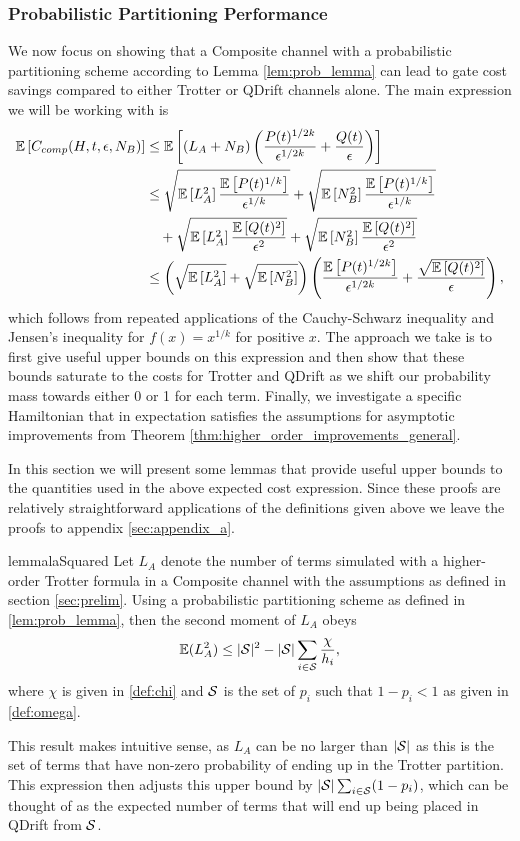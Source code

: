\subsubsection{Probabilistic Partitioning Performance} \label{sec:prob_limits}
We now focus on showing that a Composite channel with a probabilistic partitioning scheme according to Lemma \ref{lem:prob_lemma} can lead to gate cost savings compared to either Trotter or QDrift channels alone. The main expression we will be working with is
\begin{align}
    \mathbb{E}\left[ C_{comp}(H, t, \epsilon, N_B) \right] &\leq \mathbb{E}\left[ (L_A + N_B)\left( \frac{P(t)^{1/2k}}{\epsilon^{1/2k}} + \frac{Q(t)}{\epsilon} \right) \right] \\
    &\leq \sqrt{\mathbb{E}\left[ L_A^2 \right] \frac{\mathbb{E}\left[ P(t)^{1/k} \right]}{\epsilon^{1/k}}} + \sqrt{\mathbb{E}\left[ N_B^2 \right] \frac{\mathbb{E}\left[ P(t)^{1/k} \right] }{\epsilon^{1/k}} } \nonumber \\
    &\quad + \sqrt{\mathbb{E}\left[ L_A^2 \right] \frac{\mathbb{E}\left[ Q(t)^2 \right]}{\epsilon^2}} + \sqrt{\mathbb{E}\left[ N_B^2 \right] \frac{\mathbb{E}\left[ Q(t)^2 \right]}{\epsilon^2}} \\
    &\leq \left( \sqrt{\mathbb{E}\left[ L_A^2 \right]} + \sqrt{\mathbb{E}\left[ N_B^2 \right]} \right) \left( \frac{\mathbb{E}\left[ P(t)^{1/2k} \right]}{\epsilon^{1/2k}} + \frac{\sqrt{\mathbb{E}\left[ Q(t)^2 \right]}}{\epsilon} \right), \label{eq:expected_cost_basic}
\end{align}
which follows from repeated applications of the Cauchy-Schwarz inequality and Jensen's inequality for $f(x) = x^{1/k}$ for positive $x$. The approach we take is to first give useful upper bounds on this expression and then show that these bounds saturate to the costs for Trotter and QDrift as we 
shift our probability mass towards either 0 or 1 for each term. Finally, we investigate a specific Hamiltonian that in expectation satisfies the
assumptions for asymptotic improvements from Theorem \ref{thm:higher_order_improvements_general}. 

In this section we will present some lemmas that provide useful upper bounds to the quantities used in the above expected cost expression. Since these proofs are relatively straightforward applications of the definitions given above we leave the proofs to appendix \ref{sec:appendix_a}. 

\begin{restatable}{lemma}{laSquared} \label{lem:la_squared}
Let $L_A$ denote the number of terms simulated with a higher-order Trotter formula in a Composite channel with the assumptions as defined in section \ref{sec:prelim}. Using a probabilistic partitioning scheme as defined in \ref{lem:prob_lemma}, then the second moment of $L_A$ obeys
$$\mathbb{E}(L_A^2) \le |\mathcal{S}|^2 - |\mathcal{S}| \sum_{i \in \mathcal{S}} \frac{\chi}{h_i},$$
where $\chi$ is given in \ref{def:chi} and $\mathcal{S}$ is the set of $p_i$ such that $1-p_i < 1$ as given in \ref{def:omega}.
\end{restatable}
This result makes intuitive sense, as $L_A$ can be no larger than $|\mathcal{S}|$ as this is the set of terms that have non-zero probability of ending up in the Trotter partition. This expression then adjusts this upper bound by $|\mathcal{S}| \sum_{i \in \mathcal{S}} (1-p_i)$, which can be thought of as the expected number of terms that will end up being placed in QDrift from $\mathcal{S}$. 

